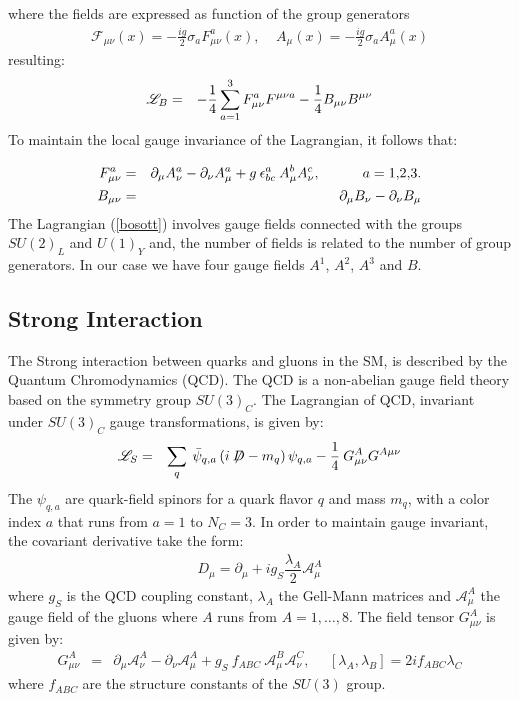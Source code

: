 \begin{flushleft}
where the fields are expressed as function of the group generators
\begin{eqnarray*}
\mathcal{ F}_{\mu\nu}(x)=-\frac{ig}{2}\sigma_{a}F^{a}_{\mu\nu}(x),\ \ \ \ \  A_{\mu}(x)=-\frac{ig}{2}\sigma_{a}A^{a}_{\mu}(x)
\end{eqnarray*}
resulting:
\begin{eqnarray}
\mathscr{L}_{B}&=&-\frac{1}{4}\sum^{3}_{a=1}F^{a}_{\mu\nu}F^{\mu\nu a}-\frac{1}{4}B_{\mu\nu}B^{\mu\nu}
\end{eqnarray}
To maintain the local gauge invariance of the Lagrangian, it follows that:
\end{flushleft}
\begin{eqnarray}
F^{a}_{\mu\nu}&=&\partial_{\mu}A^{a}_{\nu}-\partial_{\nu}A^{a}_{\mu}+g\:\epsilon^{a}_{bc}\:A^{b}_{\mu} A^{c}_{\nu},\ \ \ \ \ \ \ \ \ a=\hbox{1,2,3.}\nonumber\\
B_{\mu\nu}&=&\partial_{\mu}B_{\nu}-\partial_{\nu}B_{\mu}
\end{eqnarray}
The Lagrangian (\ref{bosott}) involves gauge fields connected with the groups $SU(2)_{L}$ and $U(1)_{Y}$ and, the number of fields is related to the number of group generators. In our case we have four gauge fields $A^{1}$, $A^{2}$, $A^{3}$ and $B$.\\

\subsection{Strong Interaction}

The Strong interaction between quarks and gluons in the SM, is described by the Quantum Chromodynamics (QCD). The QCD is a non-abelian gauge field theory based on the  symmetry group $SU(3)_{C}$.
The Lagrangian of QCD, invariant under $SU(3)_{C}$ gauge transformations, is given by:
\begin{eqnarray}
\mathscr{L}_{S}&=&\sum_{q}\:\bar{\psi}_{q,a}\left( i\not\!\! D -m_{q} \right)\psi_{q,a} - \dfrac{1}{4}\:G^{A}_{\mu\nu}G^{A \mu\nu} 
\end{eqnarray}
The $\psi_{q,a}$ are quark-field spinors for a quark flavor $q$ and mass $m_{q}$, with a color index $a$ that runs from $a=1$ to $N_{C}=3$. In order to maintain gauge invariant, the covariant derivative take the form:
\begin{eqnarray}
D_{\mu} = \partial_{\mu} + ig_{S}\dfrac{\lambda_{A}}{2}\mathcal{A}_{\mu}^{A} 
\end{eqnarray}  
where $g_{S}$ is the QCD coupling constant, $\lambda_{A}$ the Gell-Mann matrices and $\mathcal{A}_{\mu}^{A}$ the gauge field of the gluons where $A$ runs from $A=1,\dots,8$. The field tensor $G^{A}_{\mu\nu}$ is given by:
\begin{eqnarray}\label{gluon}
G^{A}_{\mu\nu}&=&\partial_{\mu}\mathcal{A}^{A}_{\nu}-\partial_{\nu}\mathcal{A}^{A}_{\mu}+g_{S}\:f_{ABC}\:\mathcal{A}^{B}_{\mu} \mathcal{A}^{C}_{\nu},\ \ \ \ \ \
\left[ \lambda_{A}, \lambda_{B} \right] = 2if_{ABC}\lambda_{C}
\end{eqnarray}
where $f_{ABC}$ are the structure constants of the $SU(3)$ group.

